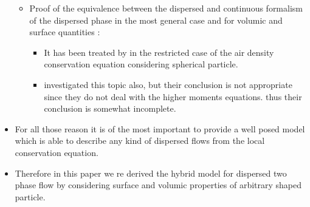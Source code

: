 \begin{itemize}
\begin{itemize}
        \item Proof of the equivalence between the dispersed and continuous formalism of the dispersed phase in the most general case and for volumic and surface quantities : 
        \begin{itemize}
            \item 
            It has been treated by \citet{lhuillier2000bilan} in the restricted case of the air density conservation equation considering spherical particle.
            \item \citet{nott2011suspension} investigated this topic also, but their conclusion is not appropriate since they do not deal with the higher moments equations. thus their conclusion is somewhat incomplete. 
        \end{itemize}
    \end{itemize}
    \item  For all those reason it is of the most important to provide a well posed model which is able to describe any kind of dispersed flows from the local conservation equation. 
    \item Therefore in this paper we re derived the hybrid model for dispersed two phase flow by considering surface and volumic properties of arbitrary shaped particle.
\end{itemize}